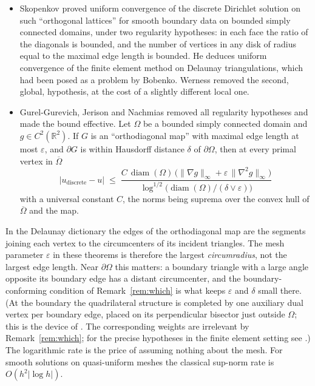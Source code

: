 \documentclass[11pt]{amsart}
\theoremstyle{definition}
\theoremstyle{remark}
\newcommand{\R}{\mathbb{R}}
\newcommand{\eps}{\varepsilon}
\DeclareMathOperator{\diam}{diam}
\begin{document}
\begin{itemize}[leftmargin=*]
\item Skopenkov \cite{Sko13} proved uniform convergence of the discrete Dirichlet solution on such ``orthogonal lattices'' for smooth boundary data on bounded simply connected domains, under two
regularity hypotheses: in each face the ratio of the diagonals is bounded, and the number of vertices in any disk of radius equal to the maximal edge length is bounded.
He deduces uniform convergence of the finite element method on Delaunay triangulations, which had been posed as a problem by Bobenko. Werness \cite{Wer15} removed the second, global, hypothesis, at the cost of a slightly different local one.
\item Gurel-Gurevich, Jerison and Nachmias \cite{GJN20} removed all regularity hypotheses and made the bound effective. Let $\Omega$ be a bounded simply connected domain and $g\in C^2(\R^2)$. If $G$ is an ``orthodiagonal map'' with maximal edge length at most $\eps$, and
$\partial G$ is within Hausdorff distance $\delta$ of $\partial\Omega$, then at every primal vertex in $\overline\Omega$
\[
|u_{\mathrm{discrete}}-u|\;\le\;\frac{C\,\diam(\Omega)\,\bigl(\|\nabla g\|_\infty+\eps\,\|\nabla^2g\|_\infty\bigr)}{\log^{1/2}\bigl(\diam(\Omega)/(\delta\vee\eps)\bigr)}
\]
with a universal constant $C$, the norms being suprema over the convex hull of $\overline\Omega$ and the map.
\end{itemize}

In the Delaunay dictionary the edges of the orthodiagonal map are the segments joining each vertex to the circumcenters of its incident triangles. The mesh parameter $\eps$ in these theorems
is therefore the largest \emph{circumradius}, not the largest edge length. Near $\partial\Omega$ this matters: a boundary triangle with a large angle opposite its boundary edge has a distant circumcenter, and the boundary-conforming
condition of Remark~\ref{rem:which} is what keeps $\eps$ and $\delta$ small there. (At the boundary the quadrilateral structure is completed by one auxiliary dual vertex per boundary edge, placed on its perpendicular bisector just outside $\Omega$; this is the device of \cite[Proposition~2.1]{GJN20}. The corresponding
weights are irrelevant by Remark~\ref{rem:which}; for the precise hypotheses in the finite element setting see \cite[Cor.~5.1]{Sko13}.) The logarithmic rate is the price of assuming nothing about the mesh. For smooth solutions on quasi-uniform meshes the classical sup-norm rate is $O(h^2|\log h|)$.
\end{document}
